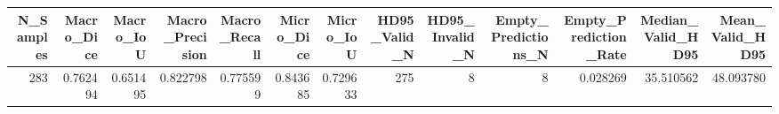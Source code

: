 \begin{tabular}{rrrrrrrrrrrrr}
\toprule
N_Samples & Macro_Dice & Macro_IoU & Macro_Precision & Macro_Recall & Micro_Dice & Micro_IoU & HD95_Valid_N & HD95_Invalid_N & Empty_Predictions_N & Empty_Prediction_Rate & Median_Valid_HD95 & Mean_Valid_HD95 \\
\midrule
283 & 0.762494 & 0.651495 & 0.822798 & 0.775599 & 0.843685 & 0.729633 & 275 & 8 & 8 & 0.028269 & 35.510562 & 48.093780 \\
\bottomrule
\end{tabular}
